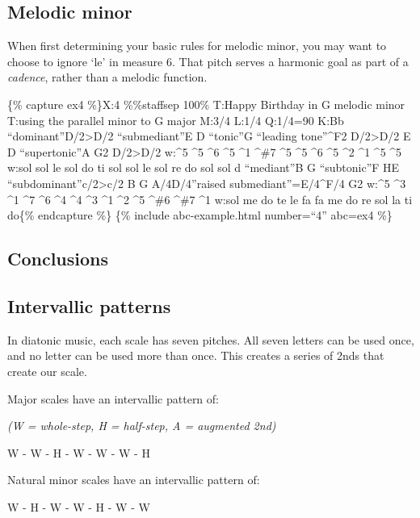 \documentclass{book}
\begin{document}
\hypertarget{melodic-minor}{%
\subsection{Melodic minor}\label{melodic-minor}}

When first determining your basic rules for melodic minor, you may want to
choose to ignore `le' in measure 6. That pitch serves a harmonic goal as part
of a \emph{cadence}, rather than a melodic function.

\{\% capture ex4 \%\}X:4 \%\%staffsep 100\% T:Happy Birthday in G melodic
minor T:using the parallel minor to G major M:3/4 L:1/4 Q:1/4=90 K:Bb
``dominant''D/2\textgreater D/2\textbar{} ``submediant''E D
``tonic''G\textbar{} ``leading tone''\^{}F2 D/2\textgreater D/2\textbar{} E D
``supertonic''A\textbar{} G2 D/2\textgreater D/2\textbar{} w:\^{}5 \^{}5 \^{}6
\^{}5 \^{}1 \^{}\#7 \^{}5 \^{}5 \^{}6 \^{}5 \^{}2 \^{}1 \^{}5 \^{}5 w:sol sol
le sol do ti sol sol le sol re do sol sol d ``mediant''B G\textbar{}
``subtonic''F HE ``subdominant''c/2\textgreater c/2\textbar{} B G
A/4D/4''raised submediant''=E/4\^{}F/4\textbar{} G2\textbar{]} w:\^{}5 \^{}3
\^{}1 \^{}7 \^{}6 \^{}4 \^{}4 \^{}3 \^{}1 \^{}2 \^{}5 \^{}\#6 \^{}\#7 \^{}1
w:sol me do te le fa fa me do re sol la ti do\{\% endcapture \%\} \{\% include
abc-example.html number=``4'' abc=ex4 \%\}

\hypertarget{conclusions-18}{%
\subsection{Conclusions}\label{conclusions-18}}

\hypertarget{intervallic-patterns}{%
\subsection{Intervallic patterns}\label{intervallic-patterns}}

In diatonic music, each scale has seven pitches. All seven letters can be used
once, and no letter can be used more than once. This creates a series of 2nds
that create our scale.

Major scales have an intervallic pattern of:

\emph{(W = whole-step, H = half-step, A = augmented 2nd)}

W - W - H - W - W - W - H

Natural minor scales have an intervallic pattern of:

W - H - W - W - H - W - W
\end{document}
